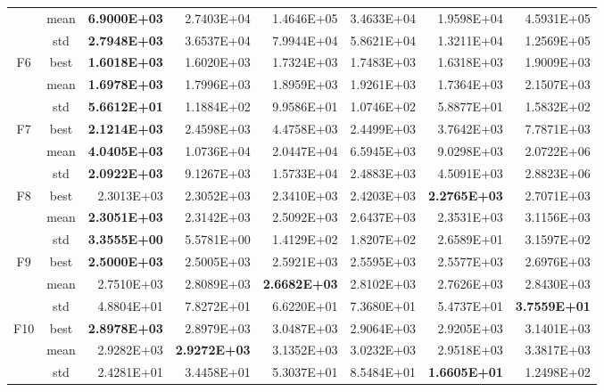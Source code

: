 \documentclass{wzuthesis}
\begin{document}
\begin{table}[htbp]
\begin{tabular}{ccrrrrrr}
          & mean  & \textbf{6.9000E+03} & 2.7403E+04 & 1.4646E+05 & 3.4633E+04 & 1.9598E+04 & 4.5931E+05 \\
          & std   & \textbf{2.7948E+03} & 3.6537E+04 & 7.9944E+04 & 5.8621E+04 & 1.3211E+04 & 1.2569E+05 \\
    \multirow{3}[0]{*}{F6} & best  & \textbf{1.6018E+03} & 1.6020E+03 & 1.7324E+03 & 1.7483E+03 & 1.6318E+03 & 1.9009E+03 \\
          & mean  & \textbf{1.6978E+03} & 1.7996E+03 & 1.8959E+03 & 1.9261E+03 & 1.7364E+03 & 2.1507E+03 \\
          & std   & \textbf{5.6612E+01} & 1.1884E+02 & 9.9586E+01 & 1.0746E+02 & 5.8877E+01 & 1.5832E+02 \\
    \multirow{3}[0]{*}{F7} & best  & \textbf{2.1214E+03} & 2.4598E+03 & 4.4758E+03 & 2.4499E+03 & 3.7642E+03 & 7.7871E+03 \\
          & mean  & \textbf{4.0405E+03} & 1.0736E+04 & 2.0447E+04 & 6.5945E+03 & 9.0298E+03 & 2.0722E+06 \\
          & std   & \textbf{2.0922E+03} & 9.1267E+03 & 1.5733E+04 & 2.4883E+03 & 4.5091E+03 & 2.8823E+06 \\
    \multirow{3}[0]{*}{F8} & best  & 2.3013E+03 & 2.3052E+03 & 2.3410E+03 & 2.4203E+03 & \textbf{2.2765E+03} & 2.7071E+03 \\
          & mean  & \textbf{2.3051E+03} & 2.3142E+03 & 2.5092E+03 & 2.6437E+03 & 2.3531E+03 & 3.1156E+03 \\
          & std   & \textbf{3.3555E+00} & 5.5781E+00 & 1.4129E+02 & 1.8207E+02 & 2.6589E+01 & 3.1597E+02 \\
    \multirow{3}[0]{*}{F9} & best  & \textbf{2.5000E+03} & 2.5005E+03 & 2.5921E+03 & 2.5595E+03 & 2.5577E+03 & 2.6976E+03 \\
          & mean  & 2.7510E+03 & 2.8089E+03 & \textbf{2.6682E+03} & 2.8102E+03 & 2.7626E+03 & 2.8430E+03 \\
          & std   & 4.8804E+01 & 7.8272E+01 & 6.6220E+01 & 7.3680E+01 & 5.4737E+01 & \textbf{3.7559E+01} \\
    \multirow{3}[0]{*}{F10} & best  & \textbf{2.8978E+03} & 2.8979E+03 & 3.0487E+03 & 2.9064E+03 & 2.9205E+03 & 3.1401E+03 \\
          & mean  & 2.9282E+03 & \textbf{2.9272E+03} & 3.1352E+03 & 3.0232E+03 & 2.9518E+03 & 3.3817E+03 \\
          & std   & 2.4281E+01 & 3.4458E+01 & 5.3037E+01 & 8.5484E+01 & \textbf{1.6605E+01} & 1.2498E+02 \\
          \bottomrule
    \end{tabular}%
\end{table}%
\end{document}
